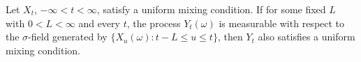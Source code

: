 Let $X_t$, $-\infty < t < \infty$, satisfy a uniform mixing condition. If for some fixed $L$ with $0 < L < \infty$ and every $t$, the process $Y_t(\omega)$ is measurable with respect to the $\sigma$-field generated by $\{X_u(\omega) : t - L \leq u \leq t\}$, then $Y_t$ also satisfies a uniform mixing condition.
